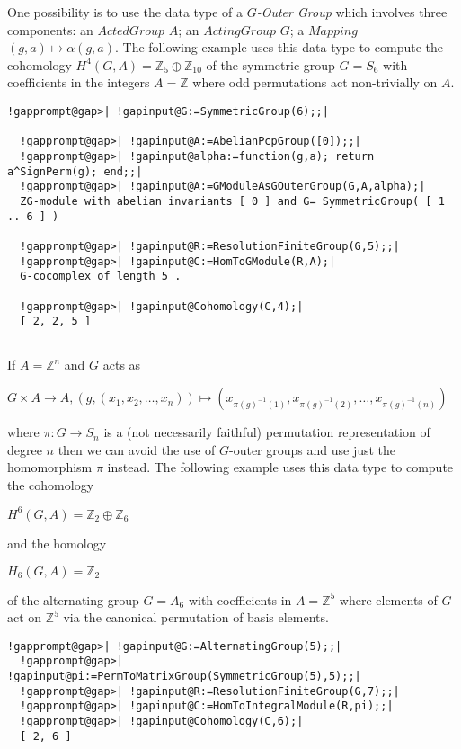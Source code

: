 \documentclass[a4paper,11pt]{report}
\begin{document}
{{One possibility is to use the data type of a \emph{$G$-Outer Group} which involves three components: an $ActedGroup$ $A$; an $Acting Group$ $G$; a $Mapping$ $(g,a)\mapsto \alpha(g,a)$. The following example uses this data type to compute the cohomology $H^4(G,A) =\mathbb Z_5 \oplus \mathbb Z_{10}$ of the symmetric group $G=S_6$ with coefficients in the integers $A=\mathbb Z$ where odd permutations act non-trivially on $A$. 
\begin{Verbatim}[commandchars=!@|,fontsize=\small,frame=single,label=Example]
  !gapprompt@gap>| !gapinput@G:=SymmetricGroup(6);;|
  
  !gapprompt@gap>| !gapinput@A:=AbelianPcpGroup([0]);;|
  !gapprompt@gap>| !gapinput@alpha:=function(g,a); return a^SignPerm(g); end;;|
  !gapprompt@gap>| !gapinput@A:=GModuleAsGOuterGroup(G,A,alpha);|
  ZG-module with abelian invariants [ 0 ] and G= SymmetricGroup( [ 1 .. 6 ] )
  
  !gapprompt@gap>| !gapinput@R:=ResolutionFiniteGroup(G,5);;|
  !gapprompt@gap>| !gapinput@C:=HomToGModule(R,A);|
  G-cocomplex of length 5 . 
  
  !gapprompt@gap>| !gapinput@Cohomology(C,4);|
  [ 2, 2, 5 ]
  
\end{Verbatim}
 

 If $A=\mathbb Z^n$ and $G$ acts as 

$G\times A \rightarrow A, (g, (x_1,x_2,\ldots,x_n)) \mapsto
(x_{\pi(g)^{-1}(1)}, x_{\pi(g)^{-1}(2)}, \ldots, x_{\pi(g)^{-1}(n)})$ 

 where $\pi\colon G\rightarrow S_n$ is a (not necessarily faithful) permutation representation of degree $n$ then we can avoid the use of $G$-outer groups and use just the homomorphism $\pi$ instead. The following example uses this data type to compute the cohomology 

$H^6(G,A) =\mathbb Z_2 \oplus \mathbb Z_{6}$ 

and the homology 

$H_6(G,A) =\mathbb Z_2 $ 

 of the alternating group $G=A_6$ with coefficients in $A=\mathbb Z^5$ where elements of $G$ act on $\mathbb Z^5$ via the canonical permutation of basis elements. 
\begin{Verbatim}[commandchars=!@|,fontsize=\small,frame=single,label=Example]
  !gapprompt@gap>| !gapinput@G:=AlternatingGroup(5);;|
  !gapprompt@gap>| !gapinput@pi:=PermToMatrixGroup(SymmetricGroup(5),5);;|
  !gapprompt@gap>| !gapinput@R:=ResolutionFiniteGroup(G,7);;|
  !gapprompt@gap>| !gapinput@C:=HomToIntegralModule(R,pi);;|
  !gapprompt@gap>| !gapinput@Cohomology(C,6);|
  [ 2, 6 ]
  

\end{Verbatim}}}
\end{document}
